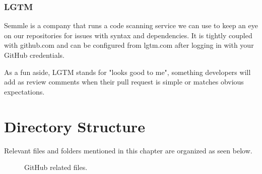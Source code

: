 \subsubsection{LGTM}

Semmle is a company that runs a code scanning service we can use to keep
an eye on our repositories for issues with syntax and dependencies. It
is tightly coupled with github.com and can be configured from lgtm.com
after logging in with your GitHub credentials.

\justify
As a fun aside, LGTM stands for "looks good to me", something developers
will add as review comments when their pull request is simple or matches
obvious expectations.

\clearpage


\section{Directory Structure}

Relevant files and folders mentioned in this chapter are organized as
seen below.

\begin{figure}[!htb]
  
  \caption{GitHub related files.}
\end{figure}

